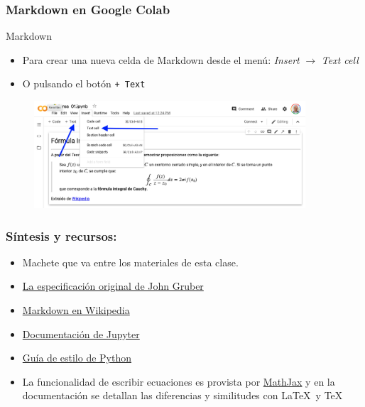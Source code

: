 \documentclass{beamer}
\begin{document}
\begin{frame}[fragile]
\frametitle{Markdown en Google Colab}
\begin{block}{Markdown}
\begin{itemize}
\item Para crear una nueva celda de Markdown desde el menú:  {\em Insert} $\rightarrow$ {\em Text cell}
\item O pulsando el botón {\tt + Text}
\end{itemize}
\end{block}
\begin{figure}
    \centering
    \includegraphics[width=0.9\textwidth]{figuras/colab.png}
\end{figure}


\end{frame}

\begin{frame}
\frametitle{Síntesis y recursos:}

\begin{itemize}
\item Machete que va entre los materiales de esta clase.
\item \href{https://daringfireball.net/projects/markdown/syntax}{La especificación original de John Gruber}
\item \href{https://en.wikipedia.org/wiki/Markdown}{Markdown en Wikipedia}
\item \href{https://jupyter-notebook.readthedocs.io/en/stable/index.html}{Documentación de Jupyter}
\item \href{https://www.python.org/dev/peps/pep-0008/}{Guía de estilo de Python}
\item La funcionalidad de escribir ecuaciones es provista por \href{https://docs.mathjax.org/en/latest/input/tex/}{MathJax} y en la documentación se detallan las diferencias y similitudes con \LaTeX\ y \TeX
\end{itemize}
\end{frame}
\end{document}
